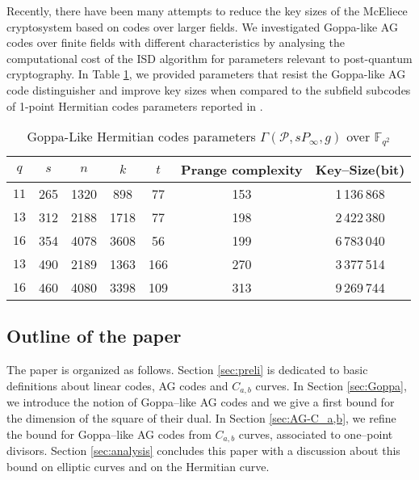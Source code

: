\documentclass[a4paper]{amsart}
\theoremstyle{definition}
\theoremstyle{remark}
\newcommand{\calP}{\mathcal{P}}
\newcommand{\F}{\mathbb{F}}
\begin{document}
Recently, there have been many attempts to reduce the key sizes of the McEliece cryptosystem based on codes over larger fields. We investigated Goppa-like AG codes over finite fields with different characteristics by analysing the computational cost of the ISD algorithm for parameters relevant to post-quantum cryptography. In Table \ref{table:goppa-herm}, we provided parameters that resist the Goppa-like AG code distinguisher and improve key sizes when compared to the subfield subcodes of 1-point Hermitian codes parameters reported in \cite[Table~3]{EKN21crypto}.

\begin{table}[h]
	\begin{center}
		\begin{tabular}{|c|c|c|c|c|c|c|}
			\hline
			$q$&  $s$ & $n$ & $k$ & $t$ & Prange complexity & Key--Size(bit)\\
			\hline \hline
			
		${11}$	&265&1320& 898& 77& 153& 1\,136\,868 \\
		
			\hline \hline
			${13}$&312&2188& 1718& 77& 198& 2\,422\,380  \\
			
			\hline 
		${16}$&354& 4078& 3608& 56& 199& 6\,783\,040   \\
		
			\hline \hline
		${13}$& 490& 2189& 1363& 166& 270& 3\,377\,514 \\
		
			\hline 
			${16}$& 460 &4080& 3398& 109& 313& 9\,269\,744\\
			\hline
		\end{tabular}
		\caption{Goppa-Like Hermitian codes parameters $\Gamma(\calP,sP_\infty,g)$ over $\F_{q^2}$} \label{table:goppa-herm}
	\end{center}
\end{table}




\subsection*{Outline of the paper}

The paper is organized as follows. Section \ref{sec:preli} is dedicated to basic definitions about linear codes, AG codes and $C_{a,b}$ curves. In Section \ref{sec:Goppa}, we introduce the notion of Goppa--like AG codes and we give a first bound for the dimension of the square of their dual. In Section \ref{sec:AG-C_a,b}, we refine the bound for Goppa--like AG codes from $C_{a,b}$ curves, associated to one--point divisors. Section \ref{sec:analysis} concludes this paper with a discussion about this bound on elliptic curves and on the Hermitian curve.
\end{document}
